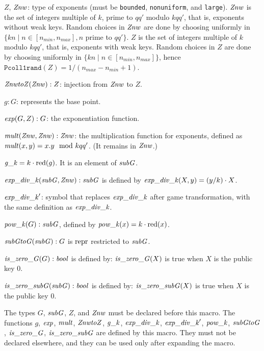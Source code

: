 \documentclass{article}
\begin{document}
\begin{itemize}
\begin{itemize}
\begin{itemize}
       $Z$, $\mathit{Znw}$: type of exponents (must be \texttt{bounded}, \texttt{nonuniform}, and \texttt{large}). 
   $\mathit{Znw}$ is the set of integers multiple of $k$, prime to $qq'$ modulo $kqq'$, that is, exponents without weak keys.
     Random choices in $\mathit{Znw}$ are done by choosing uniformly in 
     $\{ kn \mid n \in [n_{min},n_{max}], n$ prime to $qq' \}$.
       $Z$ is the set of integers multiple of $k$ modulo $kqq'$, that is, exponents with weak keys. Random choices in $Z$ are done by choosing uniformly in 
   $\{ kn \mid n \in [n_{min},n_{max}] \}$, hence $\texttt{Pcoll1rand}(Z) = 1/(n_{max}-n_{min}+1)$. 
       
       $\mathit{ZnwtoZ}(\mathit{Znw}):Z$: injection from $\mathit{Znw}$ to $Z$.

       $g: G$: represents the base point.

       $\mathit{exp}(G, Z): G$: the exponentiation function.  
       
       $\mathit{mult}(\mathit{Znw}, \mathit{Znw}): \mathit{Znw}$: the multiplication function for exponents, defined as
       $\mathit{mult}(x,y) = x.y \mod kqq'$. (It remains in $\mathit{Znw}$.)

       $\mathit{g\_k} = {k}\cdot{\mathrm{red}(g)}$. It is an element of $\mathit{subG}$.

       $\mathit{exp\_div\_k}(\mathit{subG},\mathit{Znw}): \mathit{subG}$ is defined by $\mathit{exp\_div\_k}(X,y) = {(y/k)}\cdot{X}$.

       $\mathit{exp\_div\_k}'$: symbol that replaces $\mathit{exp\_div\_k}$ after game transformation,
       with the same definition as $\mathit{exp\_div\_k}$.

       $\mathit{pow\_k}(G):\mathit{subG}$, defined by $\mathit{pow\_k}(x) = {k}\cdot{\mathrm{red}(x)}$.

       $\mathit{subGtoG}(\mathit{subG}):G$ is $\mathrm{repr}$ restricted to $\mathit{subG}$.

       $\mathit{is\_zero\_G}(G): \mathit{bool}$ is defined by: $\mathit{is\_zero\_G}(X)$ is true when $X$ is the public key 0.
       
       $\mathit{is\_zero\_subG}(\mathit{subG}): \mathit{bool}$ is defined by: $\mathit{is\_zero\_subG}(X)$ is true when $X$ is the public key 0.

       The types $G$, $\mathit{subG}$, $Z$, and $\mathit{Znw}$ must be declared before this macro.  The
       functions $g$, $\mathit{exp}$, $\mathit{mult}$, $\mathit{ZnwtoZ}$, $\mathit{g\_k}$, $\mathit{exp\_div\_k}$, $\mathit{exp\_div\_k}'$, $\mathit{pow\_k}$, $\mathit{subGtoG}$,
       $\mathit{is\_zero\_G}$, $\mathit{is\_zero\_subG}$ are defined by this macro. They must not be declared
       elsewhere, and they can be used only after expanding the macro.


\end{itemize}
\end{itemize}
\end{itemize}
\end{document}

